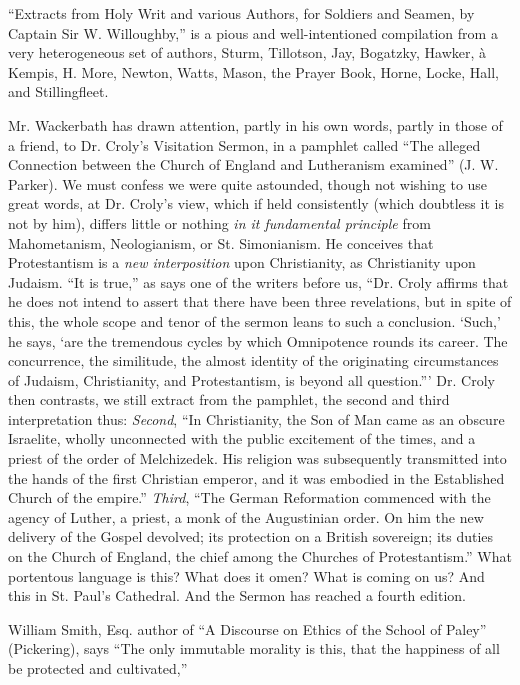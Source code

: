 ``Extracts from Holy Writ and various Authors, for
Soldiers and Seamen, by Captain Sir W. Willoughby,'' is a pious and
well-intentioned compilation from a very heterogeneous set of authors,
Sturm, Tillotson, Jay, Bogatzky, Hawker, à Kempis, H. More, Newton,
Watts, Mason, the Prayer Book, Horne, Locke, Hall, and Stillingfleet.

Mr. Wackerbath has drawn attention, partly in his
own words, partly in those of a friend, to Dr. Croly's Visitation
Sermon, in a pamphlet called ``The alleged Connection between the
Church of England and Lutheranism examined'' (J. W. Parker). We must
confess we were quite astounded, though not wishing to use great words,
at Dr. Croly's view, which if held consistently (which doubtless it is
not by him), differs little or nothing \emph{in it fundamental principle}
from Mahometanism, Neologianism, or St. Simonianism. He conceives that
Protestantism is a \emph{new interposition} upon Christianity, as
Christianity upon Judaism. ``It is true,'' as says one of the writers
before us, ``Dr. Croly affirms that he does not intend to assert that
there have been three revelations, but in spite of this, the whole scope
and tenor of the sermon leans to such a conclusion. ‘Such,' he says,
‘are the tremendous cycles by which Omnipotence rounds its career. The
concurrence, the similitude, the almost identity of the originating
circumstances of Judaism, Christianity, and Protestantism, is beyond all
question.''' Dr. Croly then contrasts, we still extract from the
pamphlet, the second and third interpretation thus: \emph{Second}, ``In
Christianity, the Son of Man came as an obscure Israelite, wholly
unconnected with the public excitement of the times, and a priest of the
order of Melchizedek. His religion was subsequently transmitted into the
hands of the first Christian emperor, and it was embodied in the
Established Church of the empire.'' \emph{Third}, ``The German
Reformation commenced with the agency of Luther, a priest, a monk of the
Augustinian order. On him the new delivery of the Gospel devolved; its
protection on a British sovereign; its duties on the Church of England,
the chief among the Churches of Protestantism.'' What portentous
language is this? What does it omen? What is coming on us? And this in
St. Paul's Cathedral. And the Sermon has reached a fourth edition.

William Smith, Esq. author of ``A Discourse on
Ethics of the School of Paley'' (Pickering), says ``The only
immutable morality is this, that the happiness of all be protected and
cultivated,''


